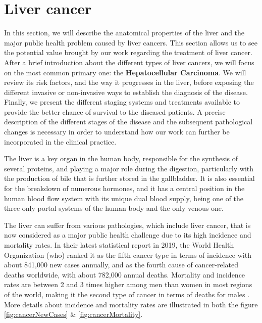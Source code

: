 \chapter{Liver cancer} \label{liverCancer}


In this section, we will describe the anatomical properties of the liver
and the major public health problem caused by liver cancers. This
section allows us to see the potential value brought by our work
regarding the treatment of liver cancer.
After a brief introduction about the different types of liver cancers,
we will focus on the most common primary one: the \textbf{Hepatocellular
Carcinoma}. We will review its risk factors, and the way it progresses in
the liver, before exposing the different invasive or non-invasive ways
to establish the diagnosis of the disease. Finally, we present the
different staging systems and treatments available to provide the better
chance of survival to the diseased patients. A precise description of
the different stages of the disease and the subsequent pathological
changes is necessary in order to understand how our work can further be
incorporated in the clinical practice.

The liver is a key organ in the human body, responsible for the
synthesis of several proteins, and playing a major role during the
digestion, particularly with the production of bile that is further
stored in the gallbladder. It is also essential for the breakdown of
numerous hormones, and it has a central position in the human blood flow
system with its unique dual blood supply, being one of the three only portal
systems of the human body and the only venous one.

The liver can suffer from various pathologies, which
include liver cancer, that is now considered as a major public health
challenge due to its high incidence and mortality rates. In their latest
statistical report in 2019, the World Health Organization (\ac{who}) ranked it as the fifth
cancer type in terms of incidence with about 841,000 new cases annually,
and as the fourth cause of cancer-related deaths worldwide, with about
782,000 annual deaths. Mortality and incidence rates are between 2 and 3
times higher among men than women in most regions of the world, making
it the second type of cancer in terms of deaths for males \cite{F.Bray2018a}. More details about incidence and mortality rates are illustrated in both the figure \ref{fig:cancerNewCases} \& \ref{fig:cancerMortality}. \\


